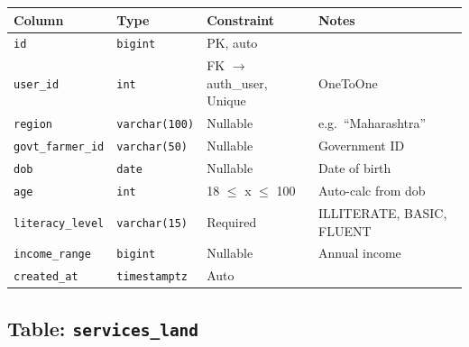 \documentclass[11pt,a4paper]{article}
\begin{document}
\begin{table}[H]
\centering
\begin{tabularx}{\textwidth}{l l l X}
\toprule
\textbf{Column} & \textbf{Type} & \textbf{Constraint} & \textbf{Notes} \\
\midrule
\texttt{id}              & \texttt{bigint}       & PK, auto             & \\
\texttt{user\_id}        & \texttt{int}          & FK $\to$ auth\_user, Unique & OneToOne \\
\texttt{region}          & \texttt{varchar(100)} & Nullable             & e.g.\ ``Maharashtra'' \\
\texttt{govt\_farmer\_id} & \texttt{varchar(50)}  & Nullable             & Government ID \\
\texttt{dob}             & \texttt{date}         & Nullable             & Date of birth \\
\texttt{age}             & \texttt{int}          & 18 $\leq$ x $\leq$ 100 & Auto-calc from dob \\
\texttt{literacy\_level} & \texttt{varchar(15)}  & Required             & ILLITERATE, BASIC, FLUENT \\
\texttt{income\_range}   & \texttt{bigint}       & Nullable             & Annual income \\
\texttt{created\_at}     & \texttt{timestamptz}  & Auto                 & \\
\bottomrule
\end{tabularx}
\end{table}

\subsection{Table: \texttt{services\_land}}
\end{document}
